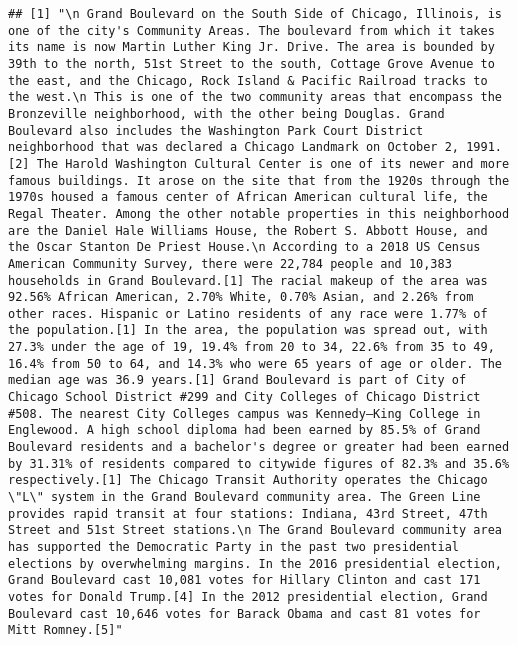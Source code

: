 \documentclass[
]{article}
\begin{document}
\begin{verbatim}
## [1] "\n Grand Boulevard on the South Side of Chicago, Illinois, is one of the city's Community Areas. The boulevard from which it takes its name is now Martin Luther King Jr. Drive. The area is bounded by 39th to the north, 51st Street to the south, Cottage Grove Avenue to the east, and the Chicago, Rock Island & Pacific Railroad tracks to the west.\n This is one of the two community areas that encompass the Bronzeville neighborhood, with the other being Douglas. Grand Boulevard also includes the Washington Park Court District neighborhood that was declared a Chicago Landmark on October 2, 1991.[2] The Harold Washington Cultural Center is one of its newer and more famous buildings. It arose on the site that from the 1920s through the 1970s housed a famous center of African American cultural life, the Regal Theater. Among the other notable properties in this neighborhood are the Daniel Hale Williams House, the Robert S. Abbott House, and the Oscar Stanton De Priest House.\n According to a 2018 US Census American Community Survey, there were 22,784 people and 10,383 households in Grand Boulevard.[1] The racial makeup of the area was 92.56% African American, 2.70% White, 0.70% Asian, and 2.26% from other races. Hispanic or Latino residents of any race were 1.77% of the population.[1] In the area, the population was spread out, with 27.3% under the age of 19, 19.4% from 20 to 34, 22.6% from 35 to 49, 16.4% from 50 to 64, and 14.3% who were 65 years of age or older. The median age was 36.9 years.[1] Grand Boulevard is part of City of Chicago School District #299 and City Colleges of Chicago District #508. The nearest City Colleges campus was Kennedy–King College in Englewood. A high school diploma had been earned by 85.5% of Grand Boulevard residents and a bachelor's degree or greater had been earned by 31.31% of residents compared to citywide figures of 82.3% and 35.6% respectively.[1] The Chicago Transit Authority operates the Chicago \"L\" system in the Grand Boulevard community area. The Green Line provides rapid transit at four stations: Indiana, 43rd Street, 47th Street and 51st Street stations.\n The Grand Boulevard community area has supported the Democratic Party in the past two presidential elections by overwhelming margins. In the 2016 presidential election, Grand Boulevard cast 10,081 votes for Hillary Clinton and cast 171 votes for Donald Trump.[4] In the 2012 presidential election, Grand Boulevard cast 10,646 votes for Barack Obama and cast 81 votes for Mitt Romney.[5]"
\end{verbatim}
\end{document}
